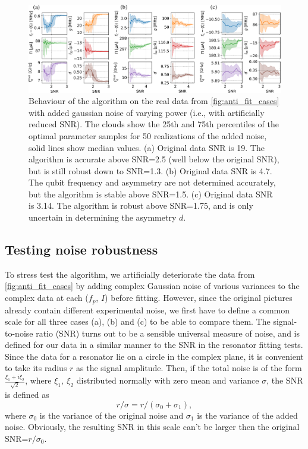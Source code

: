 \documentclass[%
 aip,
 draft,
 amsmath,amssymb,
 reprint,%
]{revtex4-1}
\begin{document}
\begin{figure}
	\centering
	\includegraphics[width=\linewidth]{noise_test}
	\caption{Behaviour of the algorithm on the real data from \autoref{fig:anti_fit_cases} with added gaussian noise of varying power (i.e., with artificially reduced SNR). The clouds show the 25th and 75th percentiles of the optimal parameter samples for 50 realizations of the added noise, solid lines show median values. (a) Original data SNR is 19. The algorithm is accurate above SNR=2.5 (well below the original SNR), but is still robust down to SNR=1.3. (b) Original data SNR is 4.7. The qubit frequency and asymmetry are not determined accurately, but the algorithm is stable above SNR=1.5. (c) Original data SNR is 3.14. The algorithm is robust above SNR=1.75, and is only uncertain in determining the asymmetry $d$.}
	\label{fig:noise_test}
\end{figure}

\subsection{Testing noise robustness}

To stress test the algorithm, we artificially deteriorate the data from \autoref{fig:anti_fit_cases} by adding complex Gaussian noise of various variances to the complex data at each ($f_p$, $I$) before fitting. However, since the original pictures already contain different experimental noise, we first have to define a common scale for all three cases (a), (b) and (c) to be able to compare them. The signal-to-noise ratio (SNR) turns out to be a sensible universal measure of noise, and is defined for our data in a similar manner to the SNR in the resonator fitting tests\cite{probst2015}. Since the data for a resonator lie on a circle in the complex plane, it is convenient to take its radius $r$ as the signal amplitude. Then, if the total noise is of the form $\frac{\xi_1+i\xi_2}{\sqrt 2}$, where $\xi_1,\ \xi_2$ distributed normally with zero mean and variance $\sigma$, the SNR is defined as 
\begin{equation}
r/\sigma = r/(\sigma_0+\sigma_1),
\label{eq:SNR}
\end{equation}
where $\sigma_0$ is the variance of the original noise and $\sigma_1$ is the variance of the added noise. Obviously, the resulting SNR in this scale can't be larger then the original SNR=$r/\sigma_0$. 
\end{document}
